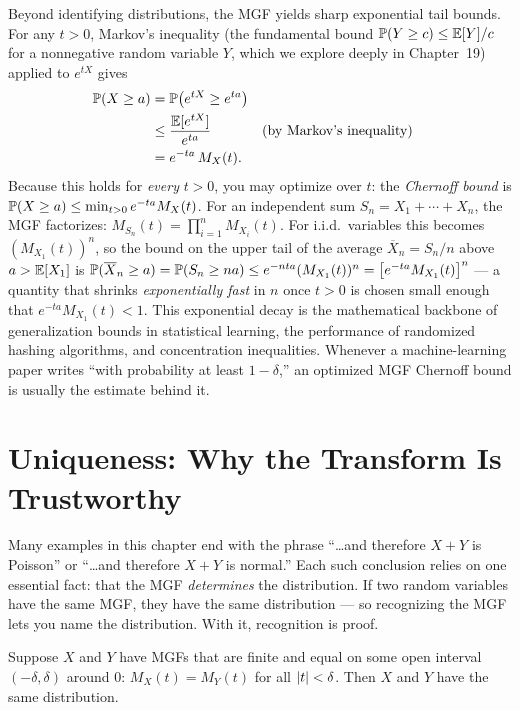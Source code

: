 \begin{applicationbox}
Beyond identifying distributions, the MGF yields
sharp exponential tail bounds. For any $t>0$, Markov's
inequality (the fundamental bound $\P(Y\ge c)\le \E[Y]/c$ for a nonnegative
random variable $Y$, which we explore deeply in Chapter~19) applied to $e^{tX}$ gives
\begin{align*}
  \P(X\ge a) &= \P\!\left(e^{tX}\ge e^{ta}\right) \\
             &\le \frac{\E[e^{tX}]}{e^{ta}} && \text{(by Markov's inequality)} \\
             &= e^{-ta}\,M_X(t).
\end{align*}
Because this holds for \emph{every} $t>0$, you may optimize over $t$: the
\emph{Chernoff bound} is $\P(X\ge a)\le \min_{t>0} e^{-ta}M_X(t)$. For an
independent sum $S_n=X_1+\cdots+X_n$, the MGF factorizes:
$M_{S_n}(t) = \prod_{i=1}^n M_{X_i}(t)$. For i.i.d.\ variables this becomes
$(M_{X_1}(t))^n$, so the bound on the upper tail of the average $\overline{X}_n = S_n/n$ above $a > \E[X_1]$ is
$\P(\overline{X}_n \ge a) = \P(S_n \ge na) \le e^{-nta}(M_{X_1}(t))^n = \big[e^{-ta} M_{X_1}(t)\big]^n$ --- a quantity that shrinks
\emph{exponentially fast} in $n$ once $t>0$ is chosen small enough that $e^{-ta}M_{X_1}(t) < 1$. This exponential decay
is the mathematical backbone of generalization bounds in statistical learning,
the performance of randomized hashing algorithms, and concentration inequalities.
Whenever a machine-learning paper writes ``with probability at least $1-\delta$,''
an optimized MGF Chernoff bound is usually the estimate behind it.
\end{applicationbox}



\section{Uniqueness: Why the Transform Is Trustworthy}
\label{ch18:uniqueness}

Many examples in this chapter end with the phrase ``\dots and therefore $X+Y$ is
Poisson'' or ``\dots and therefore $X+Y$ is normal.'' Each such conclusion
relies on one essential fact: that the MGF \emph{determines} the
distribution. If two random variables have the same MGF, they have the same
distribution --- so recognizing the MGF lets you name the distribution. With it, recognition is proof.

\begin{theorem}
\label{ch18:thm-uniqueness}
Suppose $X$ and $Y$ have MGFs that are finite and equal on some open interval
$(-\delta,\delta)$ around $0$: $M_X(t)=M_Y(t)$ for all $\abs{t}<\delta$. Then
$X$ and $Y$ have the same distribution.
\end{theorem}

